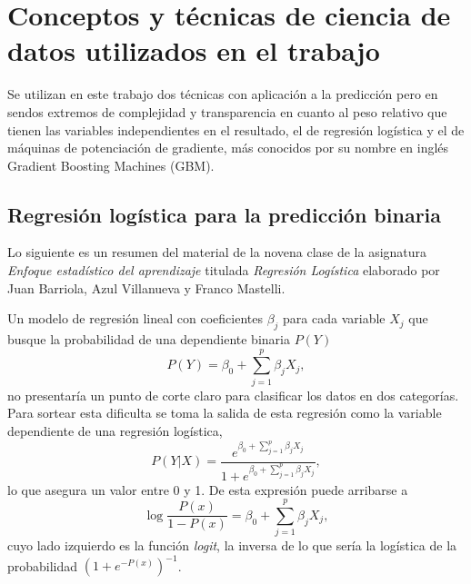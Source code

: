 \documentclass[a4paper]{report}
\begin{document}
\section{Conceptos y técnicas de ciencia de datos utilizados en el trabajo}


Se utilizan en este trabajo dos técnicas con aplicación a la predicción pero en sendos extremos de complejidad y transparencia en cuanto al peso relativo que tienen las variables independientes en el resultado, el de regresión logística y el de máquinas de potenciación de gradiente, más conocidos por su nombre en inglés Gradient Boosting Machines (GBM).


\subsection{Regresión logística para la predicción binaria}

Lo siguiente es un resumen del material de la novena clase de la asignatura \emph{Enfoque estadístico del aprendizaje} titulada \emph{Regresión Logística} elaborado por Juan Barriola, Azul Villanueva y Franco Mastelli. 

Un modelo de regresión lineal con coeficientes \(\beta_j\) para cada variable \(X_j\) que busque la probabilidad de una dependiente binaria \(P(Y)\)  
\[
P(Y) = \beta_0 + \sum\limits_{j=1}^p \beta_j X_j,	
\]
no presentaría un punto de corte claro para clasificar los datos en dos categorías.
Para sortear esta dificulta se toma la salida de esta regresión como la variable dependiente de una regresión logística,
\[
P(Y|X)= \frac{e^{\beta_0 + \sum\limits_{j=1}^p \beta_j X_j}}{1+e^{\beta_0 + \sum\limits_{j=1}^p \beta_j X_j}},
\]
lo que asegura un valor entre 0 y 1.
De esta expresión puede arribarse a 
\[
	\log {\frac{P(x)}{1-P(x)}}= \beta_0 + \sum\limits_{j=1}^p \beta_j X_j,
\]
cuyo lado izquierdo es la función \emph{logit}, la inversa de lo que sería la logística de la probabilidad \(\left(1 + e^{-{P(x)}}\right)^{-1}\).
\end{document}

